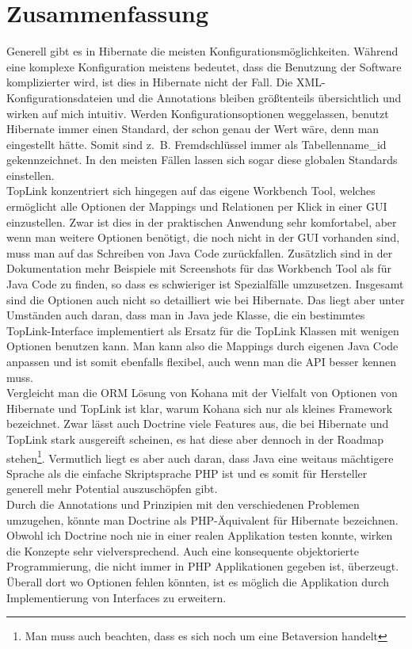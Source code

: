 \section{Zusammenfassung}

Generell gibt es in Hibernate die meisten Konfigurationsmöglichkeiten. Während eine komplexe Konfiguration meistens bedeutet, dass die Benutzung der Software komplizierter wird, ist dies in Hibernate nicht der Fall. Die XML-Konfigurationsdateien und die Annotations bleiben größtenteils übersichtlich und wirken auf mich intuitiv. Werden Konfigurationsoptionen weggelassen, benutzt Hibernate immer einen Standard, der schon genau der Wert wäre, denn man eingestellt hätte. Somit sind z.~B. Fremdschlüssel immer als Tabellenname\_id gekennzeichnet. In den meisten Fällen lassen sich sogar diese globalen Standards einstellen.\\
TopLink konzentriert sich hingegen auf das eigene Workbench Tool, welches er\-mög\-licht alle Optionen der Mappings und Relationen per Klick in einer GUI einzustellen. Zwar ist dies in der praktischen Anwendung sehr komfortabel, aber wenn man weitere Optionen benötigt, die noch nicht in der GUI vorhanden sind, muss man auf das Schreiben von Java Code zurückfallen. Zusätzlich sind in der Dokumentation mehr Beispiele mit Screenshots für das Workbench Tool als für Java Code zu finden, so dass es schwieriger ist Spezialfälle umzusetzen. Insgesamt sind die Optionen auch nicht so detailliert wie bei Hibernate. Das liegt aber unter Umständen auch daran, dass man in Java jede Klasse, die ein bestimmtes TopLink-Interface implementiert als Ersatz für die TopLink Klassen mit wenigen Optionen benutzen kann. Man kann also die Mappings durch eigenen Java Code anpassen und ist somit ebenfalls flexibel, auch wenn man die API besser kennen muss.\\
Vergleicht man die ORM Lösung von Kohana mit der Vielfalt von Optionen von Hibernate und TopLink ist klar, warum Kohana sich nur als kleines Framework bezeichnet. Zwar lässt auch Doctrine viele Features aus, die bei Hibernate und TopLink stark ausgereift scheinen, es hat diese aber dennoch in der Roadmap stehen\footnote{Man muss auch beachten, dass es sich noch um eine Betaversion handelt}. Vermutlich liegt es aber auch daran, dass Java eine weitaus mächtigere Sprache als die einfache Skriptsprache PHP ist und es somit für Hersteller generell mehr Potential auszuschöpfen gibt.\\
Durch die Annotations und Prinzipien mit den verschiedenen Problemen umzugehen, könnte man Doctrine als PHP-Äquivalent für Hibernate bezeichnen. Obwohl ich Doctrine noch nie in einer realen Applikation testen konnte, wirken die Konzepte sehr vielversprechend. Auch eine konsequente objektorierte Programmierung, die nicht immer in PHP Applikationen gegeben ist, überzeugt. Überall dort wo Optionen fehlen könnten, ist es möglich die Applikation durch Implementierung von Interfaces zu erweitern. \\
